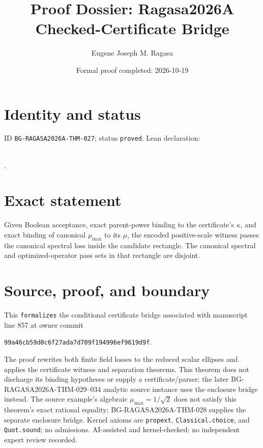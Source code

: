 \documentclass[11pt]{article}
\title{Proof Dossier: Ragasa2026A Checked-Certificate Bridge}\author{Eugene Joseph M. Ragasa}\date{Formal proof completed: 2026-10-19}
\begin{document}
\maketitle
\section{Identity and status}
ID \texttt{BG-RAGASA2026A-THM-027}; status \texttt{proved}. Lean declaration:
\par{}\\
{\tiny{}}.
\section{Exact statement}
Given Boolean acceptance, exact parent-power binding to the certificate's $\kappa$, and
exact binding of canonical $\mu_{\max}$ to its $\mu$, the encoded positive-scale witness
passes the canonical spectral loss inside the candidate rectangle. The canonical spectral
and optimized-operator pass sets in that rectangle are disjoint.
\section{Source, proof, and boundary}
This \texttt{formalizes} the conditional certificate bridge associated with manuscript
line 857 at owner commit
\begin{center}\small\texttt{99a46cb59d0c6f27ada7d709f194996ef9619d9f}.\end{center}
The proof rewrites both finite field losses to the reduced scalar ellipses and applies the
certificate witness and separation theorems. This theorem does not discharge its binding
hypotheses or supply a certificate/parser; the later BG-RAGASA2026A-THM-029--034 analytic
source instance uses the enclosure bridge instead. The source example's algebraic $\mu_{\max}=1/\sqrt{2}$ does not satisfy this theorem's exact
rational equality; BG-RAGASA2026A-THM-028 supplies the separate enclosure bridge. Kernel
axioms are \texttt{propext}, \texttt{Classical.choice}, and \texttt{Quot.sound}; no
admissions. AI-assisted and kernel-checked; no independent expert review recorded.
\end{document}
